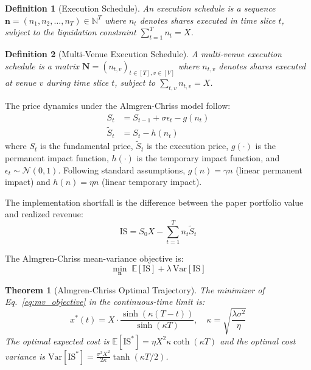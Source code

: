 \documentclass[11pt]{article}
\newcommand{\bN}{\mathbf{N}}
\newcommand{\Nat}{\mathbb{N}}
\newcommand{\E}{\mathbb{E}}
\newtheorem{theorem}{Theorem}
\newtheorem{definition}{Definition}
\begin{document}
\begin{definition}[Execution Schedule]
An execution schedule is a sequence $\mathbf{n} = (n_1, n_2, \ldots, n_T) \in \Nat^T$ where $n_t$ denotes shares executed in time slice $t$, subject to the liquidation constraint $\sum_{t=1}^T n_t = X$.
\end{definition}

\begin{definition}[Multi-Venue Execution Schedule]
A multi-venue execution schedule is a matrix $\bN = (n_{t,v})_{t \in [T], v \in [V]}$ where $n_{t,v}$ denotes shares executed at venue $v$ during time slice $t$, subject to $\sum_{t,v} n_{t,v} = X$.
\end{definition}

The price dynamics under the Almgren-Chriss model follow:
\begin{align}
S_t &= S_{t-1} + \sigma \epsilon_t - g(n_t) \label{eq:price_dynamics}\\
\tilde{S}_t &= S_t - h(n_t) \label{eq:execution_price}
\end{align}
where $S_t$ is the fundamental price, $\tilde{S}_t$ is the execution price, $g(\cdot)$ is the permanent impact function, $h(\cdot)$ is the temporary impact function, and $\epsilon_t \sim \mathcal{N}(0,1)$. Following standard assumptions, $g(n) = \gamma n$ (linear permanent impact) and $h(n) = \eta n$ (linear temporary impact).

The implementation shortfall is the difference between the paper portfolio value and realized revenue:
\begin{equation}
\text{IS} = S_0 X - \sum_{t=1}^T n_t \tilde{S}_t
\end{equation}

The Almgren-Chriss mean-variance objective is:
\begin{equation}
\min_{\mathbf{n}} \; \E[\text{IS}] + \lambda \, \mathrm{Var}[\text{IS}]
\label{eq:mv_objective}
\end{equation}

\begin{theorem}[Almgren-Chriss Optimal Trajectory]
\label{thm:ac_solution}
The minimizer of Eq.~\eqref{eq:mv_objective} in the continuous-time limit is:
\begin{equation}
x^*(t) = X \cdot \frac{\sinh(\kappa(T-t))}{\sinh(\kappa T)}, \quad \kappa = \sqrt{\frac{\lambda \sigma^2}{\eta}}
\end{equation}
The optimal expected cost is $\E[\text{IS}^*] = \eta X^2 \kappa \coth(\kappa T)$ and the optimal cost variance is $\mathrm{Var}[\text{IS}^*] = \frac{\sigma^2 X^2}{2\kappa}\tanh(\kappa T/2)$.
\end{theorem}
\end{document}
